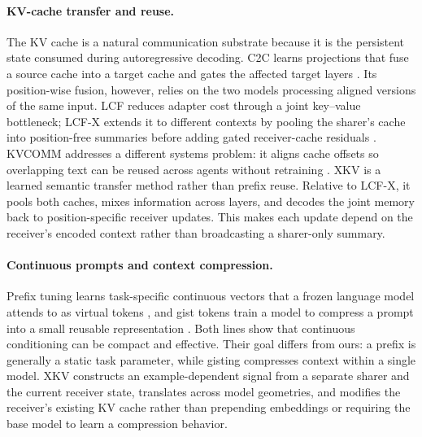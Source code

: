 \documentclass[11pt]{article}
\newcommand{\xkv}{\textsc{XKV}\xspace}
\newcommand{\lcfx}{\textsc{LCF-X}\xspace}
\begin{document}
\paragraph{KV-cache transfer and reuse.}
The KV cache is a natural communication substrate because it is the persistent
state consumed during autoregressive decoding. C2C learns projections that fuse
a source cache into a target cache and gates the affected target layers
\cite{fu2025cachetocache}. Its position-wise fusion, however, relies on the two
models processing aligned versions of the same input. LCF reduces adapter cost
through a joint key--value bottleneck; \lcfx extends it to different contexts by
pooling the sharer's cache into position-free summaries before adding gated
receiver-cache residuals \cite{rossi2026latentcacheflow}. KVCOMM addresses a
different systems problem: it aligns cache offsets so overlapping text can be
reused across agents without retraining \cite{ye2025kvcomm}. \xkv is a learned
semantic transfer method rather than prefix reuse. Relative to \lcfx, it pools
both caches, mixes information across layers, and decodes the joint memory back
to position-specific receiver updates. This makes each update depend on the
receiver's encoded context rather than broadcasting a sharer-only summary.

\paragraph{Continuous prompts and context compression.}
Prefix tuning learns task-specific continuous vectors that a frozen language
model attends to as virtual tokens \cite{li2021prefixtuning}, and gist tokens
train a model to compress a prompt into a small reusable representation
\cite{mu2023gist}. Both lines show that continuous conditioning can be compact
and effective. Their goal differs from ours: a prefix is generally a static
task parameter, while gisting compresses context within a single model. \xkv
constructs an example-dependent signal from a separate sharer and the current
receiver state, translates across model geometries, and modifies the receiver's
existing KV cache rather than prepending embeddings or requiring the base model
to learn a compression behavior.



\end{document}
